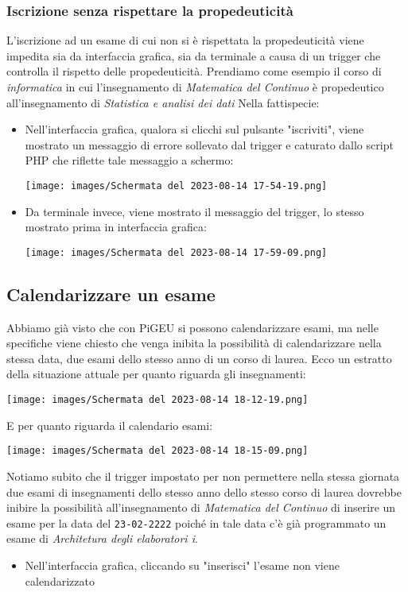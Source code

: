 \documentclass{article}
\begin{document}
\subsubsection{Iscrizione senza rispettare la propedeuticità}
L'iscrizione ad un esame di cui non si è rispettata la propedeuticità viene impedita sia da interfaccia grafica, sia da terminale a causa di un trigger che controlla il rispetto delle propedeuticità. Prendiamo come esempio il corso di \textit{informatica} in cui l'insegnamento di \textit{Matematica del Continuo} è propedeutico all'insegnamento di \textit{Statistica e analisi dei dati}
Nella fattispecie:
\begin{itemize}
    \item Nell'interfaccia grafica, qualora si clicchi sul pulsante "iscriviti", viene mostrato un messaggio di errore sollevato dal trigger e caturato dallo script PHP che riflette tale messaggio a schermo:

    \texttt{[image: images/Schermata del 2023-08-14 17-54-19.png]}

    \item Da terminale invece, viene mostrato il messaggio del trigger, lo stesso mostrato prima in interfaccia grafica:

    \texttt{[image: images/Schermata del 2023-08-14 17-59-09.png]}
\end{itemize}

\subsection{Calendarizzare un esame}
Abbiamo già visto che con PiGEU si possono calendarizzare esami, ma nelle specifiche viene chiesto che venga inibita la possibilità di calendarizzare nella stessa data, due esami dello stesso anno di un corso di laurea.
Ecco un estratto della situazione attuale per quanto riguarda gli insegnamenti:

\texttt{[image: images/Schermata del 2023-08-14 18-12-19.png]}

E per quanto riguarda il calendario esami:

\texttt{[image: images/Schermata del 2023-08-14 18-15-09.png]}

Notiamo subito che il trigger impostato per non permettere nella stessa giornata due esami di insegnamenti dello stesso anno dello stesso corso di laurea dovrebbe inibire la possibilità all'insegnamento di \textit{Matematica del Continuo} di inserire un esame per la data del \texttt{23-02-2222} poiché in tale data c'è già programmato un esame di \textit{Architetura degli elaboratori i}.
\begin{itemize}
    \item Nell'interfaccia grafica, cliccando su "inserisci" l'esame non viene calendarizzato
\end{itemize}
\end{document}
